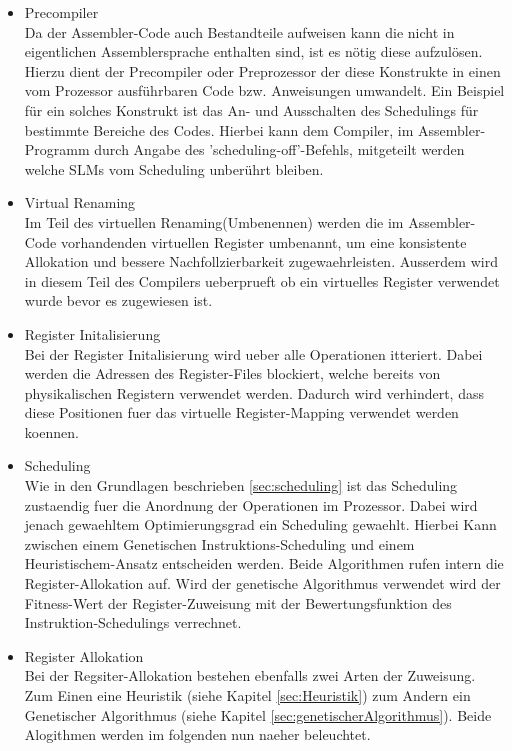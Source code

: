 \begin{itemize}
	\item Precompiler\\
		Da der Assembler-Code auch Bestandteile aufweisen kann die nicht in eigentlichen Assemblersprache enthalten sind, ist es nötig diese aufzulösen. Hierzu dient der Precompiler oder Preprozessor der diese Konstrukte in einen vom Prozessor ausführbaren Code bzw. Anweisungen umwandelt. Ein Beispiel für ein solches Konstrukt ist das An- und Ausschalten des Schedulings für bestimmte Bereiche des Codes. Hierbei kann dem Compiler, im Assembler-Programm durch Angabe des 'scheduling-off'-Befehls, mitgeteilt werden welche SLMs vom Scheduling unberührt bleiben.
	\item Virtual Renaming\\
		Im Teil des virtuellen Renaming(Umbenennen) werden die im Assembler-Code vorhandenden virtuellen Register umbenannt, um eine konsistente Allokation und bessere Nachfollzierbarkeit zugewaehrleisten. Ausserdem wird in diesem Teil des Compilers ueberprueft ob ein virtuelles Register verwendet wurde bevor es zugewiesen ist.
	\item Register Initalisierung\\
		Bei der Register Initalisierung wird ueber alle Operationen itteriert. Dabei werden die Adressen des Register-Files blockiert, welche bereits von physikalischen Registern verwendet werden. Dadurch wird verhindert, dass diese Positionen fuer das virtuelle Register-Mapping verwendet werden koennen.
	\item Scheduling\\
		Wie in den Grundlagen beschrieben \ref{sec:scheduling} ist das Scheduling zustaendig fuer die Anordnung der Operationen im Prozessor. Dabei wird jenach gewaehltem Optimierungsgrad ein Scheduling gewaehlt. Hierbei Kann zwischen einem Genetischen Instruktions-Scheduling und einem Heuristischem-Ansatz entscheiden werden. Beide Algorithmen rufen intern die Register-Allokation auf. Wird der genetische Algorithmus verwendet wird der Fitness-Wert der Register-Zuweisung mit der Bewertungsfunktion des Instruktion-Schedulings verrechnet.
	\item Register Allokation\\
		Bei der Regsiter-Allokation bestehen ebenfalls zwei Arten der Zuweisung. Zum Einen eine Heuristik (siehe Kapitel \ref{sec:Heuristik}) zum Andern ein Genetischer Algorithmus (siehe Kapitel \ref{sec:genetischerAlgorithmus}). Beide Alogithmen werden im folgenden nun naeher beleuchtet.
\end{itemize}


